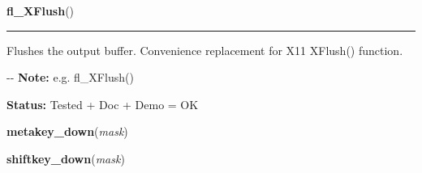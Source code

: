\hspace{.8\funcindent}\begin{boxedminipage}{\funcwidth}

    \raggedright \textbf{fl\_XFlush}()

    \vspace{-1.5ex}

    \rule{\textwidth}{0.5\fboxrule}
\setlength{\parskip}{2ex}

Flushes the output buffer. Convenience replacement for X11 XFlush()
function.

-{}-
\setlength{\parskip}{1ex}
\textbf{Note:} 
e.g. fl\_XFlush()


\textbf{Status:} 
Tested + Doc + Demo = OK


    \end{boxedminipage}

    \label{xformslib:flxbasic:metakey_down}

    \vspace{0.5ex}

\hspace{.8\funcindent}\begin{boxedminipage}{\funcwidth}

    \raggedright \textbf{metakey\_down}(\textit{mask})

\setlength{\parskip}{2ex}
\setlength{\parskip}{1ex}
    \end{boxedminipage}

    \label{xformslib:flxbasic:shiftkey_down}

    \vspace{0.5ex}

\hspace{.8\funcindent}\begin{boxedminipage}{\funcwidth}

    \raggedright \textbf{shiftkey\_down}(\textit{mask})

\setlength{\parskip}{2ex}
\setlength{\parskip}{1ex}
    \end{boxedminipage}

    \label{xformslib:flxbasic:controlkey_down}

    \vspace{0.5ex}

